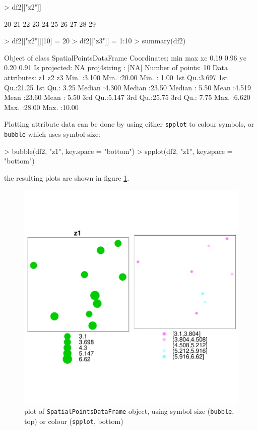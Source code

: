 \documentclass{article}
\begin{document}
\begin{Schunk}
\begin{Sinput}
> df2[["z2"]]
\end{Sinput}
\begin{Soutput}
 [1] 20 21 22 23 24 25 26 27 28 29
\end{Soutput}
\begin{Sinput}
> df2[["z2"]][10] = 20
> df2[["z3"]] = 1:10
> summary(df2)
\end{Sinput}
\begin{Soutput}
Object of class SpatialPointsDataFrame
Coordinates:
    min  max
xc 0.19 0.96
yc 0.20 0.91
Is projected: NA 
proj4string : [NA]
Number of points: 10
Data attributes:
       z1              z2              z3       
 Min.   :3.100   Min.   :20.00   Min.   : 1.00  
 1st Qu.:3.697   1st Qu.:21.25   1st Qu.: 3.25  
 Median :4.300   Median :23.50   Median : 5.50  
 Mean   :4.519   Mean   :23.60   Mean   : 5.50  
 3rd Qu.:5.147   3rd Qu.:25.75   3rd Qu.: 7.75  
 Max.   :6.620   Max.   :28.00   Max.   :10.00  
\end{Soutput}
\end{Schunk}
Plotting attribute data can be done by using either {\tt spplot} to
colour symbols, or {\tt bubble} which uses symbol size:
\begin{Schunk}
\begin{Sinput}
> bubble(df2, "z1", key.space = "bottom")
> spplot(df2, "z1", key.space = "bottom")
\end{Sinput}
\end{Schunk}
the resulting plots are shown in figure \ref{fig:spdf}.

\begin{figure}
\begin{center}
\includegraphics{sp-014}
\end{center}
\caption{plot of {\tt SpatialPointsDataFrame} object, using symbol 
size ({\tt bubble}, top) or colour ({\tt spplot}, bottom) }
\label{fig:spdf}
\end{figure}
\end{document}
